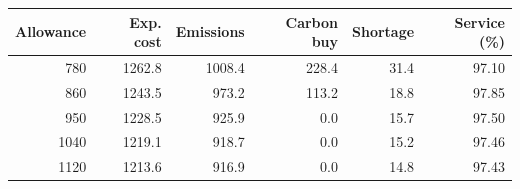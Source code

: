 \begin{tabular}{rrrrrr}
\toprule
Allowance & Exp. cost & Emissions & Carbon buy & Shortage & Service (\%) \\
\midrule
780 & 1262.8 & 1008.4 & 228.4 & 31.4 & 97.10 \\
860 & 1243.5 & 973.2 & 113.2 & 18.8 & 97.85 \\
950 & 1228.5 & 925.9 & 0.0 & 15.7 & 97.50 \\
1040 & 1219.1 & 918.7 & 0.0 & 15.2 & 97.46 \\
1120 & 1213.6 & 916.9 & 0.0 & 14.8 & 97.43 \\
\bottomrule
\end{tabular}
